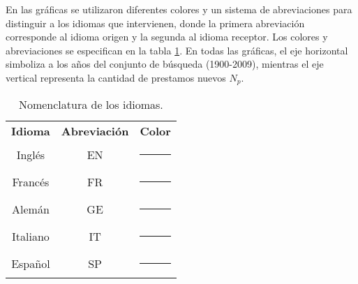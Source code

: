 

En las gráficas se utilizaron diferentes colores y un sistema de abreviaciones para distinguir a los idiomas que intervienen, donde la primera abreviación corresponde al idioma origen y la segunda al idioma receptor. Los colores y abreviaciones se especifican  en la tabla \ref{tab.idcolor}.  En todas las gráficas, el eje horizontal simboliza a los años del conjunto de búsqueda (1900-2009),  mientras el eje vertical representa la cantidad de prestamos nuevos $N_{p}$. 

\begin{table} %
	\centering
	\begin{tabular}{ccc}
		\textbf{Idioma} & \textbf{Abreviación} & \textbf{Color} \\
		Inglés          & EN                   & \textcolor{C1-EN}{\rule{0.25cm}{0.25cm}}           \\
		Francés         & FR                   & \textcolor{C1-FR}{\rule{0.25cm}{0.25cm}}      \\
		Alemán          & GE                   & \textcolor{C1-GE}{\rule{0.25cm}{0.25cm}}       \\
		Italiano        & IT                   & \textcolor{C1-IT}{\rule{0.25cm}{0.25cm}}          \\
		Español         & SP                   & \textcolor{C1-SP}{\rule{0.25cm}{0.25cm}}        
	\end{tabular}
	\caption{Nomenclatura de los idiomas.}
	\label{tab.idcolor}
\end{table} %





